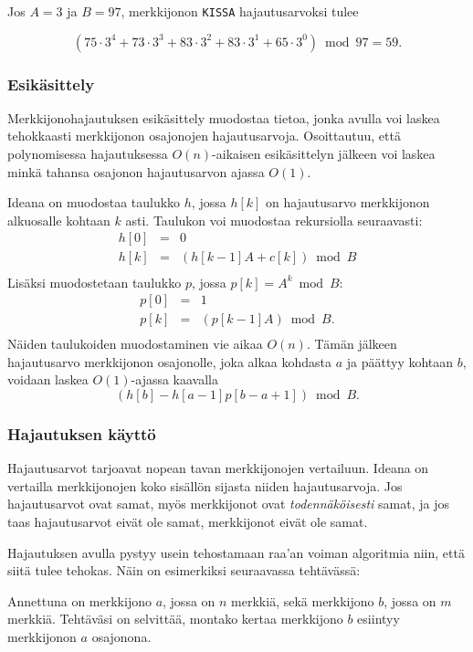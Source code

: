 Jos $A=3$ ja $B=97$, merkkijonon \texttt{KISSA} hajautusarvoksi tulee

\[(75 \cdot 3^4 + 73 \cdot 3^3 + 83 \cdot 3^2 + 83 \cdot 3^1 + 65 \cdot 3^0) \bmod 97 = 59.\]

\subsubsection*{Esikäsittely}

Merkkijonohajautuksen esikäsittely
muodostaa tietoa, jonka avulla 
voi laskea tehokkaasti merkkijonon
osajonojen hajautusarvoja.
Osoittautuu, että polynomisessa hajautuksessa
$O(n)$-aikaisen esikäsittelyn jälkeen voi laskea
minkä tahansa osajonon hajautusarvon
ajassa $O(1)$.

Ideana on muodostaa taulukko $h$,
jossa $h[k]$ on hajautusarvo merkkijonon
alkuosalle kohtaan $k$ asti.
Taulukon voi muodostaa rekursiolla seuraavasti:
\[
\begin{array}{lcl}
h[0] & = & 0 \\
h[k] & = & (h[k-1] A + c[k]) \bmod B \\
\end{array}
\]
Lisäksi muodostetaan taulukko $p$,
jossa $p[k]=A^k \bmod B$:
\[
\begin{array}{lcl}
p[0] & = & 1 \\
p[k] & = & (p[k-1] A) \bmod B. \\
\end{array}
\]
Näiden taulukoiden muodostaminen vie aikaa $O(n)$.
Tämän jälkeen hajautusarvo merkkijonon osajonolle,
joka alkaa kohdasta $a$ ja päättyy kohtaan $b$,
voidaan laskea $O(1)$-ajassa kaavalla
\[(h[b]-h[a-1] p[b-a+1]) \bmod B.\]

\subsubsection*{Hajautuksen käyttö}

Hajautusarvot tarjoavat nopean tavan merkkijonojen
vertailuun.
Ideana on vertailla merkkijonojen koko sisällön
sijasta niiden hajautusarvoja.
Jos hajautusarvot ovat samat,
myös merkkijonot ovat \textit{todennäköisesti} samat,
ja jos taas hajautusarvot eivät ole samat,
merkkijonot eivät ole samat.

Hajautuksen avulla pystyy usein tehostamaan
raa'an voiman algoritmia niin, että siitä tulee
tehokas. Näin on esimerkiksi seuraavassa tehtävässä:

\begin{task}
Annettuna on merkkijono $a$,
jossa on $n$ merkkiä,
sekä merkkijono $b$,
jossa on $m$ merkkiä.
Tehtäväsi on selvittää, montako kertaa
merkkijono $b$ esiintyy merkkijonon $a$ osajonona.
\end{task}

